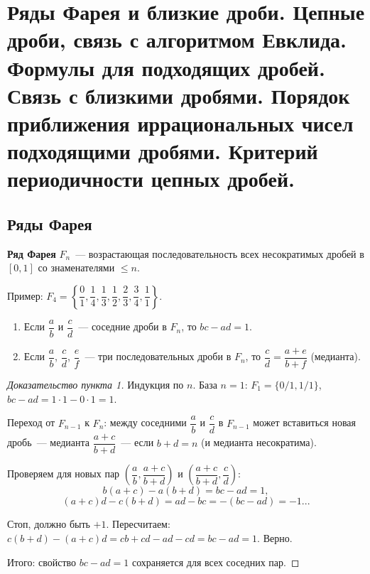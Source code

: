 \documentclass[12pt]{article}
\begin{document}
	\newpage
	
	\section{Ряды Фарея и близкие дроби. Цепные дроби, связь с алгоритмом Евклида. Формулы для подходящих дробей. Связь с близкими дробями. Порядок приближения иррациональных чисел подходящими дробями. Критерий периодичности цепных дробей.}
	
	\subsection{Ряды Фарея}
	
	\begin{definition}
		\textbf{Ряд Фарея} $F_n$~--- возрастающая последовательность всех несократимых дробей в $[0, 1]$ со знаменателями $\leqslant n$.
	\end{definition}
	
	Пример: $F_4 = \left\{\dfrac{0}{1}, \dfrac{1}{4}, \dfrac{1}{3}, \dfrac{1}{2}, \dfrac{2}{3}, \dfrac{3}{4}, \dfrac{1}{1}\right\}$.
	
	\begin{theorem}
		\begin{enumerate}
			\item Если $\dfrac{a}{b}$ и $\dfrac{c}{d}$~--- соседние дроби в $F_n$, то $bc - ad = 1$.
			\item Если $\dfrac{a}{b}$, $\dfrac{c}{d}$, $\dfrac{e}{f}$~--- три последовательных дроби в $F_n$, то $\dfrac{c}{d} = \dfrac{a+e}{b+f}$ (медианта).
		\end{enumerate}
	\end{theorem}
	
	\begin{proof}[Доказательство пункта 1]
		Индукция по $n$. База $n = 1$: $F_1 = \{0/1, 1/1\}$, $bc - ad = 1 \cdot 1 - 0 \cdot 1 = 1$.
		
		Переход от $F_{n-1}$ к $F_n$: между соседними $\dfrac{a}{b}$ и $\dfrac{c}{d}$ в $F_{n-1}$ может вставиться новая дробь~--- медианта $\dfrac{a+c}{b+d}$~--- если $b + d = n$ (и медианта несократима).
		
		Проверяем для новых пар $\left(\dfrac{a}{b}, \dfrac{a+c}{b+d}\right)$ и $\left(\dfrac{a+c}{b+d}, \dfrac{c}{d}\right)$:
		\[b(a+c) - a(b+d) = bc - ad = 1,\]
		\[(a+c)d - c(b+d) = ad - bc = -(bc - ad) = -1... \]
		
		Стоп, должно быть $+1$. Пересчитаем: $c(b+d) - (a+c)d = cb + cd - ad - cd = bc - ad = 1$. Верно.
		
		Итого: свойство $bc - ad = 1$ сохраняется для всех соседних пар.
	\end{proof}
	
\end{document}
